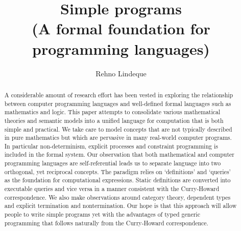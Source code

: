 \documentclass[11pt]{article}
\begin{document}
\title{Simple programs\\\small{(A formal foundation for programming languages)}}
\author{Rehno Lindeque}

\maketitle

\begin{abstract}
A considerable amount of research effort has been vested in exploring the relationship between computer programming languages and well-defined formal languages such as mathematics and logic.
This paper attempts to consolidate various mathematical theories and semantic models into a unified language for computation that is both simple and practical.
We take care to model concepts that are not typically described in pure mathematics but which are pervasive in many real-world computer programs.
In particular non-determinism, explicit processes and constraint programming is included in the formal system.
Our observation that both mathematical and computer programming languages are self-referential leads us to separate language into two orthogonal, yet reciprocal concepts.
The paradigm relies on `definitions' and `queries' as the foundation for computational expressions.
Static definitions are converted into executable queries and vice versa in a manner consistent with the Curry-Howard correspondence.
We also make observations around category theory, dependent types and explicit termination and nontermination.
Our hope is that this approach will allow people to write simple programs yet with the advantages of typed generic programming that follows naturally from the Curry-Howard correspondence.




\end{abstract}
\end{document}
